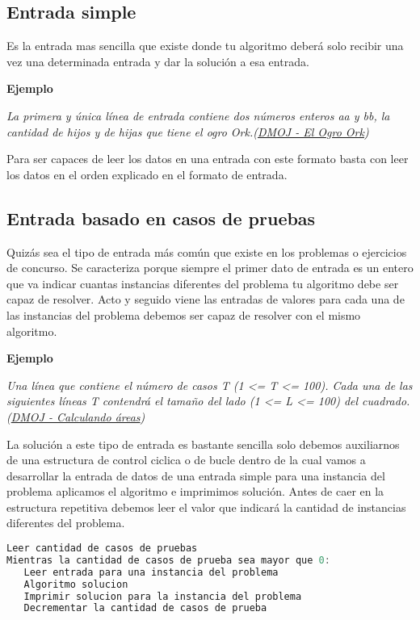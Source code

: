 \subsection{Entrada simple}

Es la entrada mas sencilla que existe donde tu algoritmo deberá solo recibir una vez una determinada entrada y dar la solución a esa entrada.

\textbf{Ejemplo}

\emph{La primera y única línea de entrada contiene dos números enteros aa y bb, la cantidad de hijos y de hijas que tiene el ogro Ork.(\href{https://dmoj.uclv.edu.cu/problem/ogroork}{DMOJ - El Ogro Ork})}

Para ser capaces de leer los datos en una entrada con este formato basta con leer los datos en el orden explicado en el formato de entrada.

\subsection{Entrada basado en casos de pruebas}

Quizás sea el tipo de entrada más común que existe en los problemas o ejercicios de concurso. Se caracteriza porque siempre el primer dato de entrada es un entero que va indicar cuantas instancias diferentes del problema tu algoritmo debe ser capaz de resolver. Acto y seguido viene las entradas de valores para cada una de las instancias del problema debemos ser capaz de resolver con el mismo algoritmo. 

\textbf{Ejemplo}

\emph{Una línea que contiene el número de casos T (1 <= T <= 100). Cada una de las siguientes líneas T contendrá el tamaño del lado (1 <= L <= 100) del cuadrado.(\href{https://dmoj.uclv.edu.cu/problem/calculandoareas}{DMOJ - Calculando áreas})}

La solución a este tipo de entrada es bastante sencilla solo debemos auxiliarnos de una estructura de control ciclica o de bucle dentro de la cual vamos a desarrollar la entrada de datos de una entrada simple para una instancia del problema aplicamos el algoritmo e imprimimos solución. Antes de caer en la estructura repetitiva debemos leer el valor que indicará la cantidad de instancias diferentes del problema.

\begin{lstlisting}[language=C++]
Leer cantidad de casos de pruebas
Mientras la cantidad de casos de prueba sea mayor que 0:
   Leer entrada para una instancia del problema
   Algoritmo solucion
   Imprimir solucion para la instancia del problema
   Decrementar la cantidad de casos de prueba

\end{lstlisting}

